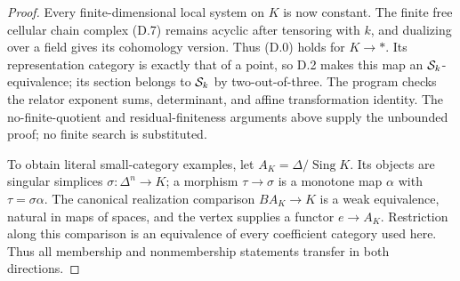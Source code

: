 \begin{proof}
Every finite-dimensional local system on $K$ is now constant.
The finite free cellular chain complex (D.7) remains acyclic after
tensoring with $k$, and dualizing over a field gives its cohomology
version. Thus (D.0) holds for $K\to *$. Its representation category
is exactly that of a point, so D.2 makes this map an $\mathcal S_k$-equivalence;
its section belongs to $\mathcal S_k$ by two-out-of-three. The program checks
the relator exponent sums, determinant, and affine transformation
identity. The no-finite-quotient and residual-finiteness arguments
above supply the unbounded proof; no finite search is substituted.

To obtain literal small-category examples, let
$A_K=\Delta/\operatorname{Sing}K$. Its objects are singular simplices
$\sigma:\Delta^n\to K$; a morphism $\tau\to\sigma$ is a monotone map
$\alpha$ with $\tau=\sigma\alpha$. The canonical realization comparison
$BA_K\to K$ is a weak equivalence, natural in maps of spaces, and the
vertex supplies a functor $e\to A_K$. Restriction along this comparison
is an equivalence of every coefficient category used here. Thus all
membership and nonmembership statements transfer in both directions.
\end{proof}

